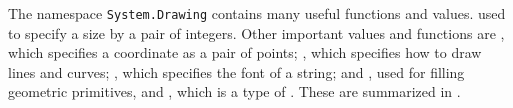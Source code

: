 \documentclass[fsharpNotes.tex]{subfiles}
\begin{document}
The namespace \lstinline{System.Drawing} contains many useful functions and values.  used  to specify a size by a pair of integers. Other important values and functions are  , which specifies a coordinate as a pair of points; , which specifies how to draw lines and curves; , which specifies the font of a string;  and , used for filling geometric primitives, and , which is a type of . These are summarized in .
\end{document}
